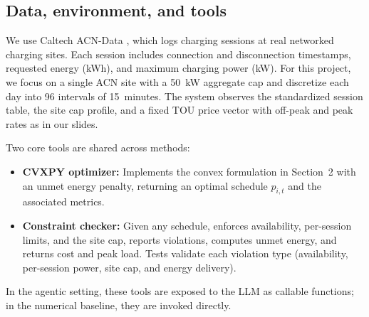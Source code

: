 \documentclass{article}
\begin{document}
\subsection{Data, environment, and tools}
We use Caltech ACN-Data \cite{acndata}, which logs charging sessions at real networked charging sites. Each session includes connection and disconnection timestamps, requested energy (kWh), and maximum charging power (kW). For this project, we focus on a single ACN site with a 50~kW aggregate cap and discretize each day into 96 intervals of 15~minutes. The system observes the standardized session table, the site cap profile, and a fixed TOU price vector with off-peak and peak rates as in our slides.

Two core tools are shared across methods:
\begin{itemize}
  \item \textbf{CVXPY optimizer:} Implements the convex formulation in Section~2 with an unmet energy penalty, returning an optimal schedule $p_{i,t}$ and the associated metrics.
  \item \textbf{Constraint checker:} Given any schedule, enforces availability, per-session limits, and the site cap, reports violations, computes unmet energy, and returns cost and peak load. Tests validate each violation type (availability, per-session power, site cap, and energy delivery).
\end{itemize}
In the agentic setting, these tools are exposed to the LLM as callable functions; in the numerical baseline, they are invoked directly.
\end{document}
